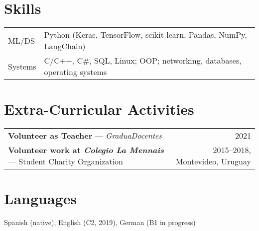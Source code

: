 \documentclass[a4paper,12pt]{article}
\begin{document}
\section{Skills}
\begin{tabularx}{\linewidth}{@{}l X@{}}
ML/DS & \normalsize{Python (Keras, TensorFlow, scikit-learn, Pandas, NumPy, LangChain)} \\
Systems & \normalsize{C/C++, C\#, SQL, Linux; OOP; networking, databases, operating systems} \\
\end{tabularx}

\section{Extra-Curricular Activities}
\begin{tabularx}{\linewidth}{@{}l r@{}} 
\textbf{Volunteer as Teacher} — \textit{GraduaDocentes} & \hfill 2021 \\[3.75pt]
\textbf{Volunteer work at \textit{Colegio La Mennais}} — Student Charity Organization & \hfill 2015--2018, Montevideo, Uruguay \\
\end{tabularx}

\section{Languages}
Spanish (native), English (C2, 2019), German (B1 in progress)
\end{document}
